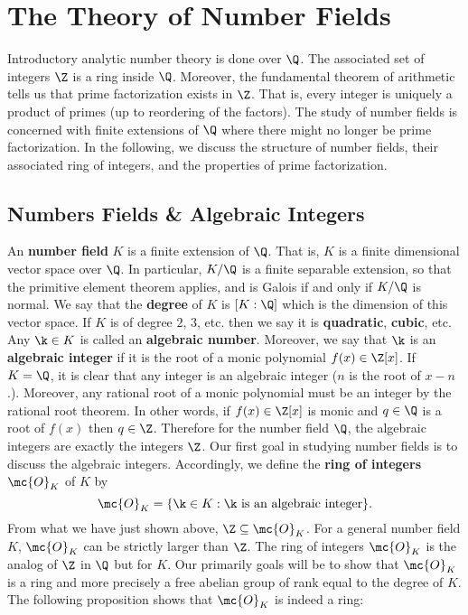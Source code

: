 \chapter{The Theory of Number Fields}
  Introductory analytic number theory is done over $\Q$. The associated set of integers $\Z$ is a ring inside $\Q$. Moreover, the fundamental theorem of arithmetic tells us that prime factorization exists in $\Z$. That is, every integer is uniquely a product of primes (up to reordering of the factors). The study of number fields is concerned with finite extensions of $\Q$ where there might no longer be prime factorization. In the following, we discuss the structure of number fields, their associated ring of integers, and the properties of prime factorization.
  \section{Numbers Fields \& Algebraic Integers}
    An \textbf{number field} $K$ is a finite extension of $\Q$. That is, $K$ is a finite dimensional vector space over $\Q$. In particular, $K/\Q$ is a finite separable extension, so that the primitive element theorem applies, and is Galois if and only if $K/\Q$ is normal. We say that the \textbf{degree} of $K$ is $[K:\Q]$ which is the dimension of this vector space. If $K$ is of degree $2$, $3$, etc. then we say it is \textbf{quadratic}, \textbf{cubic}, etc. Any $\k \in K$ is called an \textbf{algebraic number}. Moreover, we say that $\k$ is an \textbf{algebraic integer} if it is the root of a monic polynomial $f(x) \in \Z[x]$. If $K = \Q$, it is clear that any integer is an algebraic integer ($n$ is the root of $x-n$.). Moreover, any rational root of a monic polynomial must be an integer by the rational root theorem. In other words, if $f(x) \in \Z[x]$ is monic and $q \in \Q$ is a root of $f(x)$ then $q \in \Z$. Therefore for the number field $\Q$, the algebraic integers are exactly the integers $\Z$. Our first goal in studying number fields is to discuss the algebraic integers. Accordingly, we define the \textbf{ring of integers} $\mc{O}_{K}$ of $K$ by
    \[
      \mc{O}_{K} = \{\k \in K:\text{$\k$ is an algebraic integer}\}.
    \]
    From what we have just shown above, $\Z \subseteq \mc{O}_{K}$. For a general number field $K$, $\mc{O}_{K}$ can be strictly larger than $\Z$. The ring of integers $\mc{O}_{K}$ is the analog of $\Z$ in $\Q$ but for $K$. Our primarily goals will be to show that $\mc{O}_{K}$ is a ring and more precisely a free abelian group of rank equal to the degree of $K$. The following proposition shows that $\mc{O}_{K}$ is indeed a ring:

